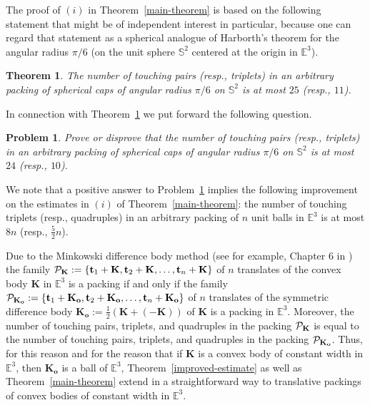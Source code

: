 \documentclass[10pt]{article}
\newtheorem{Theorem}{Theorem}
\newtheorem{Problem}{Problem}
\numberwithin{Subcase}{Case}
\begin{document}
The proof of $(i)$ in Theorem~\ref{main-theorem} is based on the following statement that might be of independent interest in particular, because one can regard that statement as a spherical analogue of Harborth's theorem \cite{Ha} for the angular radius $\pi/6$ (on the unit sphere $\mathbb{S}^2$ centered at the origin in $\mathbb{E}^3$).

\begin{Theorem}\label{spherical-main-theorem}
The number of touching pairs (resp., triplets) in an arbitrary packing of spherical caps of angular radius $\pi/6$ on $\mathbb{S}^2$ is at most $25$ (resp., $11$).
\end{Theorem}

In connection with Theorem~\ref{spherical-main-theorem} we put forward the following question.

\begin{Problem}\label{main-conjecture}
Prove or disprove that the number of touching pairs (resp., triplets) in an arbitrary packing of spherical caps of angular radius $\pi/6$ on $\mathbb{S}^2$ is at most $24$ (resp., $10$).
\end{Problem}

We note that a positive answer to Problem~\ref{main-conjecture} implies the following improvement on the estimates in $(i)$ of Theorem~\ref{main-theorem}: the number of touching triplets (resp., quadruples) in an arbitrary packing of $n$ unit balls in $\mathbb{E}^3$ is at most $8n$ (resp., $\frac{5}{2}n$).


Due to the Minkowski difference body method (see for example, Chapter 6 in \cite{Ro64}) the family ${\cal P}_{\mathbf{K}}:=\{\mathbf{t}_1+\mathbf{K}, \mathbf{t}_2+\mathbf{K}, \dots , \mathbf{t}_n+\mathbf{K}\} $ of $n$ translates of the convex body $\mathbf{K}$ in $\mathbb{E}^3$ is a packing if and only if the family ${\cal P}_{\mathbf{K}_{\mathbf{o}}}:=\{\mathbf{t}_1+\mathbf{K}_{\mathbf{o}}, \mathbf{t}_2+\mathbf{K}_{\mathbf{o}}, \dots , \mathbf{t}_n+\mathbf{K}_{\mathbf{o}}\} $ of $n$ translates of the symmetric difference body $\mathbf{K}_{\mathbf{o}}:=\frac{1}{2}(\mathbf{K}+(-\mathbf{K}))$ of $\mathbf{K}$ is a packing in $\mathbb{E}^3$. Moreover, the number of touching pairs, triplets, and quadruples in the packing ${\cal P}_{\mathbf{K}}$ is equal to the number of touching pairs, triplets, and quadruples in the packing ${\cal P}_{\mathbf{K}_{\mathbf{o}}}$. Thus, for this reason and for the reason that if $\mathbf{K}$ is a convex body of constant width in $\mathbb{E}^3$, then $\mathbf{K}_{\mathbf{o}}$ is a ball of $\mathbb{E}^3$, Theorem~\ref{improved-estimate} as well as Theorem~\ref{main-theorem} extend in a straightforward way to translative packings of convex bodies of constant width in $\mathbb{E}^3$. 
\end{document}

